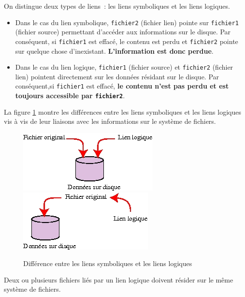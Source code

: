 On distingue deux types de liens~: les liens symboliques et les liens logiques.

\begin{itemize}
	\item	{}Dans le cas du lien symbolique, {\tt fichier2} (fichier lien)
			pointe sur {\tt fichier1} (fichier source) permettant d'acc{\'e}der
			aux informations sur le disque. Par cons{\'e}quent, si {\tt fichier1}
			est effac{\'e}, le contenu est perdu et {\tt fichier2} pointe 
			sur quelque chose d'inexistant. {\bf L'information est donc perdue}.\\
	\item	{}Dans le cas du lien logique, {\tt fichier1} (fichier source) et
			{\tt fichier2} (fichier lien) pointent directement sur les donn{\'e}es
			r{\'e}sidant sur le disque. Par cons{\'e}quent,si {\tt fichier1} est effac{\'e},
			{\bf le contenu n'est pas perdu et est toujours accessible par 
			{\tt fichier2}}.
\end{itemize}

La figure \ref{fig-cmds-links} montre les diff{\'e}rences entre les liens symboliques
et les liens logiques vis {\`a} vis de leur liaisons avec les informations sur
le syst{\`e}me de fichiers.

\begin{figure}[hbtp]
\centering
\includegraphics{./_Images/cmds-unix/log-links.jpg}
\includegraphics{./_Images/cmds-unix/symb-links.jpg}
\caption{\label{fig-cmds-links}Diff{\'e}rence entre les liens symboliques et les
liens logiques}
\end{figure}

\begin{remarque}
Deux ou plusieurs fichiers li{\'e}s par un lien logique doivent r{\'e}sider
sur le m{\^e}me syst{\`e}me de fichiers.
\end{remarque}

